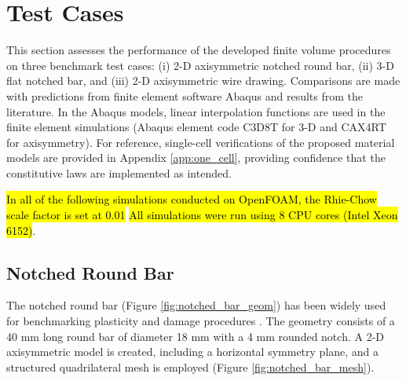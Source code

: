 \documentclass[sn-mathphys,Numbered,draft]{sn-jnl}%
\begin{document}
\section{Test Cases} \label{sec:test_cases}

This section assesses the performance of the developed finite volume procedures on three benchmark test cases: (i) 2-D axisymmetric notched round bar, (ii) 3-D flat notched bar, and (iii) 2-D axisymmetric wire drawing.
Comparisons are made with predictions from finite element software Abaqus and results from the literature.
In the Abaqus models, linear interpolation functions are used in the finite element simulations (Abaqus element code C3D8T for 3-D and CAX4RT for axisymmetry).
For reference, single-cell verifications of the proposed material models are provided in Appendix \ref{app:one_cell}, providing confidence that the constitutive laws are implemented as intended.


\hl{In all of the following simulations conducted on OpenFOAM, the Rhie-Chow scale factor is set at 0.01}
\hl{All simulations were run using 8 CPU cores (Intel Xeon 6152)}.


\subsection{Notched Round Bar}
The notched round bar (Figure \ref{fig:notched_bar_geom}) has been widely used for benchmarking plasticity and damage procedures \cite{cesar_de_sa_damage_2006, fincato_return_2018, vaz_aspects_2001}.
The geometry consists of a 40 \si{\milli\meter} long round bar of diameter 18 \si{\milli\meter} with a 4 \si{\milli\meter} rounded notch.
A 2-D axisymmetric model is created, including a horizontal symmetry plane, and a structured quadrilateral mesh is employed (Figure \ref{fig:notched_bar_mesh}).
\end{document}
